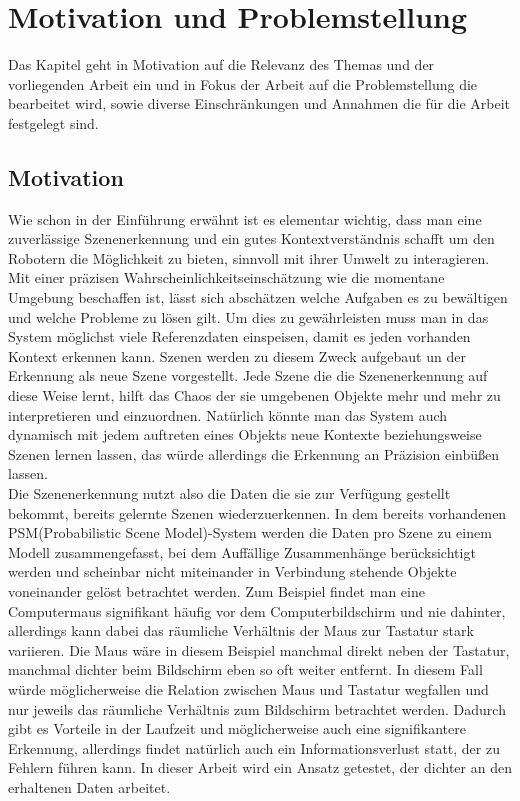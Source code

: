 \chapter{Motivation und Problemstellung}\label{ch:motivation}
Das Kapitel geht in Motivation auf die Relevanz des Themas und der vorliegenden Arbeit ein und in Fokus der Arbeit auf die Problemstellung die bearbeitet wird, sowie diverse Einschränkungen und Annahmen die für die Arbeit festgelegt sind.

\section{Motivation}
Wie schon in der Einführung erwähnt ist es elementar wichtig, dass man eine zuverlässige Szenenerkennung und ein gutes Kontextverständnis schafft um den Robotern die Möglichkeit zu bieten, sinnvoll mit ihrer Umwelt zu interagieren. Mit einer präzisen Wahrscheinlichkeitseinschätzung wie die momentane Umgebung beschaffen ist, lässt sich abschätzen welche Aufgaben es zu bewältigen und welche Probleme zu lösen gilt. Um dies zu gewährleisten muss man in das System möglichst viele Referenzdaten einspeisen, damit es jeden vorhanden Kontext erkennen kann. Szenen werden zu diesem Zweck aufgebaut un der Erkennung als neue Szene vorgestellt. Jede Szene die die Szenenerkennung auf diese Weise lernt, hilft das Chaos der sie umgebenen Objekte mehr und mehr zu interpretieren und einzuordnen. Natürlich könnte man das System auch dynamisch mit jedem auftreten eines Objekts neue Kontexte beziehungsweise Szenen lernen lassen, das würde allerdings die Erkennung an Präzision einbüßen lassen.\smallskip\\
Die Szenenerkennung nutzt also die Daten die sie zur Verfügung gestellt bekommt, bereits gelernte Szenen wiederzuerkennen. In dem bereits vorhandenen PSM(Probabilistic Scene Model)-System werden die Daten pro Szene zu einem Modell zusammengefasst, bei dem Auffällige Zusammenhänge berücksichtigt werden und scheinbar nicht miteinander in Verbindung stehende Objekte voneinander gelöst betrachtet werden. Zum Beispiel findet man eine Computermaus signifikant häufig vor dem Computerbildschirm und nie dahinter, allerdings kann dabei das räumliche Verhältnis der Maus zur Tastatur stark variieren. Die Maus wäre in diesem Beispiel manchmal direkt neben der Tastatur, manchmal dichter beim Bildschirm eben so oft weiter entfernt. In diesem Fall würde möglicherweise die Relation zwischen Maus und Tastatur wegfallen und nur jeweils das räumliche Verhältnis zum Bildschirm betrachtet werden. Dadurch gibt es Vorteile in der Laufzeit und möglicherweise auch eine signifikantere Erkennung, allerdings findet natürlich auch ein Informationsverlust statt, der zu Fehlern führen kann. In dieser Arbeit wird ein Ansatz getestet, der dichter an den erhaltenen Daten arbeitet.\smallskip\\
